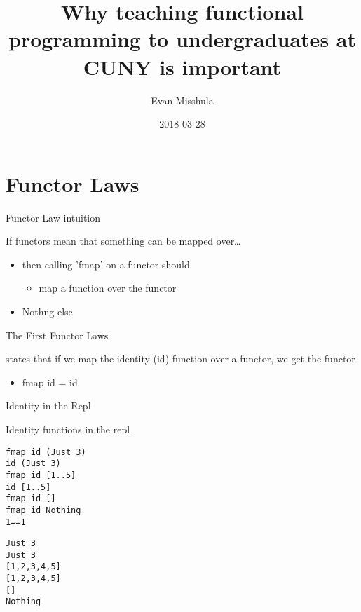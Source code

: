 \documentclass[presetation]{beamer}
\author{Evan Misshula}
\date{2018-03-28}
\title{Why teaching functional programming to undergraduates at CUNY is important}
\begin{document}
\maketitle

\section{Functor Laws}
\label{sec:orgeaca1d8}
\begin{frame}[label={sec:orgeb2cca6}]{Functor Law intuition}
\begin{block}{If functors mean that something can be mapped over\ldots{}}
\begin{itemize}
\item then calling 'fmap' on a functor should
\begin{itemize}
\item map a function over the functor
\end{itemize}
\end{itemize}
\pause
\begin{itemize}
\item \alert{Nothng else}
\end{itemize}
\end{block}
\end{frame}

\begin{frame}[label={sec:org8feac8d}]{The First Functor Laws}
\begin{definition}
states that if we map the identity (id) function over a functor, we
get the functor
\begin{itemize}
\item fmap id = id
\end{itemize}
\end{definition}
\end{frame}

\begin{frame}[fragile,label={sec:org2f384cf}]{Identity in the Repl}
 \begin{block}{Identity functions in the repl}
\begin{verbatim}
fmap id (Just 3)
id (Just 3)
fmap id [1..5]
id [1..5]
fmap id []
fmap id Nothing
1==1
\end{verbatim}

\begin{verbatim}
Just 3
Just 3
[1,2,3,4,5]
[1,2,3,4,5]
[]
Nothing
\end{verbatim}
\end{block}
\end{frame}
\end{document}
